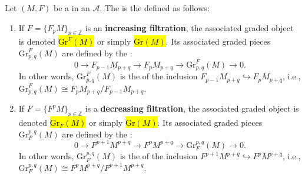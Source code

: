 \begin{definition} \label{definition:bigraded_object_associated_to_a_filtered_graded_object_in_an_abelian_category}
    Let $(M, F)$ be a  in an  $\mathcal{A}$. 
    The  is the  defined as follows:

    \begin{enumerate}
        \item If $F = \{F_p M\}_{p \in \mathbb{Z}}$ is an \textbf{increasing filtration}, the associated graded object is denoted \hl{$\text{Gr}^F(M)$} or simply \hl{$\text{Gr}(M)$}. Its associated graded pieces $\text{Gr}^F_{p,q}(M)$ are defined by the :
        $$0 \to F_{p-1} M_{p+q} \to F_p M_{p+q} \to \text{Gr}^F_{p,q}(M) \to 0.$$
        In other words, $\text{Gr}^F_{p,q}(M)$ is the  of the inclusion $F_{p-1} M_{p+q} \hookrightarrow F_p M_{p+q}$, i.e., $\text{Gr}^F_{p,q}(M) \cong F_p M_{p+q} / F_{p-1} M_{p+q}$.

        \item If $F = \{F^p M\}_{p \in \mathbb{Z}}$ is a \textbf{decreasing filtration}, the associated graded object is denoted \hl{$\text{Gr}_F(M)$} or simply \hl{$\text{Gr}(M)$}. Its associated graded pieces $\text{Gr}_F^{p,q}(M)$ are defined by the :
        $$0 \to F^{p+1} M^{p+q} \to F^p M^{p+q} \to \text{Gr}_F^{p,q}(M) \to 0.$$
        In other words, $\text{Gr}_F^{p,q}(M)$ is the  of the inclusion $F^{p+1} M^{p+q} \hookrightarrow F^p M^{p+q}$, i.e., $\text{Gr}_F^{p,q}(M) \cong F^p M^{p+q} / F^{p+1} M^{p+q}$.
    \end{enumerate}
\end{definition}